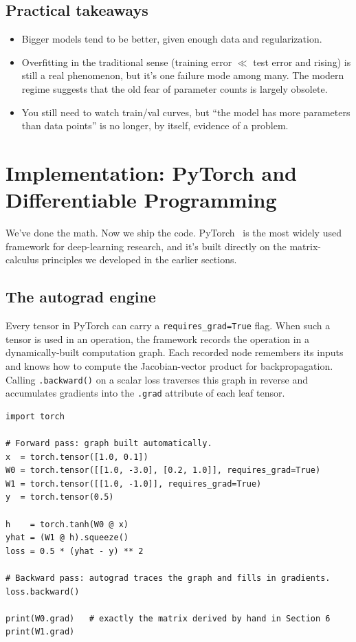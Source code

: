 \documentclass[11pt, a4paper]{article}
\let\oldsection\section
\renewcommand{\section}{\clearpage\oldsection}
\begin{document}
\subsection{Practical takeaways}

\begin{itemize}[leftmargin=*]
    \item Bigger models tend to be better, given enough data and regularization.
    \item Overfitting in the traditional sense (training error $\ll$ test error and rising) is still a real phenomenon, but it's one failure mode among many. The modern regime suggests that the old fear of parameter counts is largely obsolete.
    \item You still need to watch train/val curves, but ``the model has more parameters than data points'' is no longer, by itself, evidence of a problem.
\end{itemize}

\section{Implementation: PyTorch and Differentiable Programming}
\label{sec:pytorch}

We've done the math. Now we ship the code. PyTorch~\cite{paszke2019} is the most widely used framework for deep-learning research, and it's built directly on the matrix-calculus principles we developed in the earlier sections.

\subsection{The autograd engine}

Every tensor in PyTorch can carry a \verb|requires_grad=True| flag. When such a tensor is used in an operation, the framework records the operation in a dynamically-built computation graph. Each recorded node remembers its inputs and knows how to compute the Jacobian-vector product for backpropagation. Calling \verb|.backward()| on a scalar loss traverses this graph in reverse and accumulates gradients into the \verb|.grad| attribute of each leaf tensor.

\begin{lstlisting}
import torch

# Forward pass: graph built automatically.
x  = torch.tensor([1.0, 0.1])
W0 = torch.tensor([[1.0, -3.0], [0.2, 1.0]], requires_grad=True)
W1 = torch.tensor([[1.0, -1.0]], requires_grad=True)
y  = torch.tensor(0.5)

h    = torch.tanh(W0 @ x)
yhat = (W1 @ h).squeeze()
loss = 0.5 * (yhat - y) ** 2

# Backward pass: autograd traces the graph and fills in gradients.
loss.backward()

print(W0.grad)   # exactly the matrix derived by hand in Section 6
print(W1.grad)
\end{lstlisting}
\end{document}
